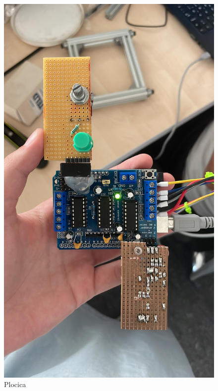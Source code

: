 \documentclass[a4paper, 11pt, titlepage]{article}
\begin{document}
\begin{figure}[htbp]
  \centering
  \begin{minipage}[b]{0.3\textwidth}
    \centering
    \includegraphics[angle = 270, width=0.75\linewidth]{frontside.jpeg}
    \caption{Plocica}
  \end{minipage}
  \hfill
  \begin{minipage}[b]{0.3\textwidth}
    \centering

\end{minipage}
\end{figure}
\end{document}
